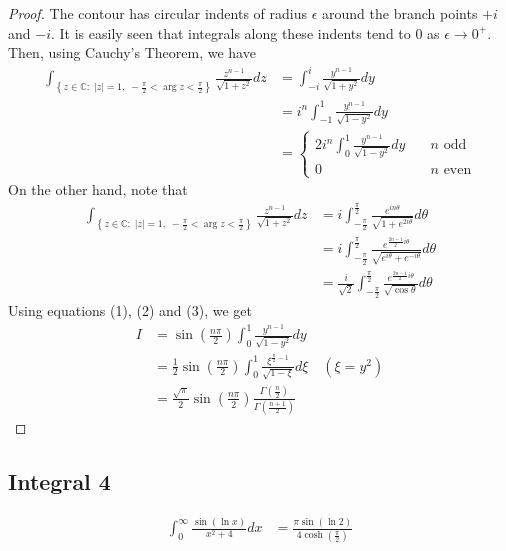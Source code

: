 \begin{proof}
The contour has circular indents of radius $\epsilon$ around the branch points $+i$ and $-i$. It is easily seen that integrals along these indents tend to 0 as $\epsilon\to 0^+$. Then, using Cauchy's Theorem, we have
\begin{align*}
\int_{\left\{z\in \mathbb{C} :\;  |z|=1 , \;  -\frac{\pi}{2}<\arg z < \frac{\pi}{2} \right\}}\frac{z^{n-1}}{\sqrt{1+z^2}}dz &= \int_{-i}^i \frac{y^{n-1}}{\sqrt{1+y^2}}dy\\
&= i^{n}\int_{-1}^1 \frac{y^{n-1}}{\sqrt{1-y^2}}dy \\
&= \begin{cases}
2 i^n \int_0^1 \frac{y^{n-1}}{\sqrt{1-y^2}}dy \quad & n\text{ odd}\\ 0 \quad & n\text{ even}
\end{cases}\tag{2}
\end{align*}
On the other hand, note that
\begin{align*}
\int_{\left\{z\in \mathbb{C} :\;  |z|=1 , \;  -\frac{\pi}{2}<\arg z < \frac{\pi}{2} \right\}}\frac{z^{n-1}}{\sqrt{1+z^2}} dz &= i\int_{-\frac{\pi}{2}}^{\frac{\pi}{2}}\frac{e^{in \theta}}{\sqrt{1+e^{2i\theta}}}d\theta \\
&= i\int_{-\frac{\pi}{2}}^{\frac{\pi}{2}}\frac{e^{\frac{2n-1}{2}i \theta}}{\sqrt{e^{i\theta}+e^{-i\theta}}}d\theta \\
&= \frac{ i}{\sqrt{2}}\int_{-\frac{\pi}{2}}^{\frac{\pi}{2}}\frac{e^{\frac{2n-1}{2}i \theta}}{\sqrt{\cos \theta}}d\theta \tag{3}
\end{align*}
Using equations (1), (2) and (3), we get
\begin{align*}
I &= \sin\left(\frac{n\pi}{2}\right)\int_0^1 \frac{y^{n-1}}{\sqrt{1-y^2}}dy \\
&= \frac{1}{2}\sin\left(\frac{n\pi}{2}\right)\int_0^1 \frac{\xi^{\frac{n}{2}-1}}{\sqrt{1-\xi}}d\xi \quad (\xi = y^2)\\
&= \frac{\sqrt{\pi}}{2}\sin\left(\frac{n\pi}{2}\right)\frac{\Gamma\left(\frac{n}{2} \right)}{\Gamma\left(\frac{n+1}{2}\right)}
\end{align*}
\end{proof}
\newpage
\subsection{Integral 4}
\begin{align*}
\int_0^\infty \frac{\sin(\ln x)}{x^2+4}dx &= \frac{\pi \sin\left(\ln 2\right)}{4\cosh\left(\frac{\pi}{2}\right)}
\end{align*}

